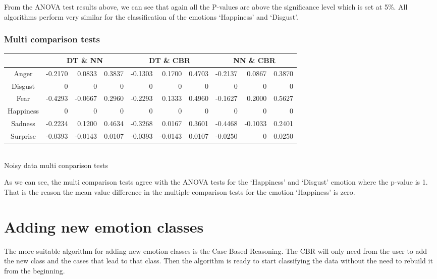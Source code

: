 \documentclass[a4paper,11pt]{article}
\begin{document}
From the ANOVA test results above, we can see that again all the P-values are
above the significance level which is set at 5\%. All algorithms perform very
similar for the classification of the emotions `Happiness' and `Disgust'.

\subsubsection{Multi comparison tests}

    \begin{center}
    \begin{tabular}{|c||r|r|r|r|r|r|r|r|r|} \hline 
    & \multicolumn{3}{|c|}{DT \& NN} & \multicolumn{3}{|c|}{DT \& CBR} & \multicolumn{3}{|c|}{NN \& CBR} \\ \hline \hline
    Anger & -0.2170 & 0.0833 & 0.3837 & -0.1303 & 0.1700 & 0.4703 & -0.2137 & 0.0867 & 0.3870 \\ \hline
    Disgust & 0 & 0 & 0 & 0 & 0 & 0 & 0 & 0 & 0\\ \hline
    Fear & -0.4293 & -0.0667 & 0.2960 & -0.2293 & 0.1333 & 0.4960 & -0.1627 & 0.2000 & 0.5627 \\ \hline
    Happiness & 0 & 0 & 0& 0 & 0 & 0 & 0 & 0 & 0 \\ \hline
    Sadness & -0.2234 & 0.1200 & 0.4634 & -0.3268 & 0.0167 & 0.3601 & -0.4468 & -0.1033 & 0.2401 \\ \hline
    Surprise & -0.0393 & -0.0143 & 0.0107 & -0.0393 & -0.0143 & 0.0107 & -0.0250 & 0 & 0.0250 \\ \hline
    \end{tabular}\vspace{5pt}\\
    Noisy data multi conparison tests
    \end{center}

As we can see, the multi comparison tests agree with the ANOVA tests for the
`Happiness' and `Disgust' emotion where the p-value is 1. That is the reason
the mean value difference in the multiple comparison tests for the emotion
`Happiness' is zero. 

\section{Adding new emotion classes}

The more suitable algorithm for adding new emotion classes is the Case Based
Reasoning. The CBR will only need from the user to add the new class and the
cases that lead to that class. Then the algorithm is ready to start classifying
the data without the need to rebuild it from the beginning.
\end{document}
